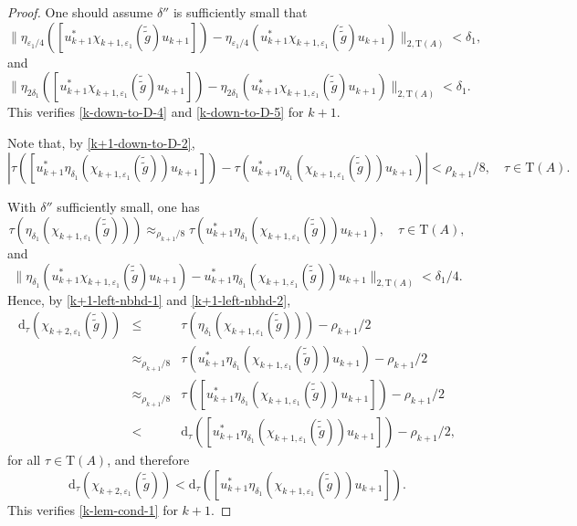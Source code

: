 \documentclass[12pt, oneside, psamsfonts]{amsart}
\theoremstyle{definition}
\theoremstyle{remark}
\numberwithin{equation}{section}
\newcommand{\norm}[1]{\| #1\|}
\newcommand{\abs}[1]{| #1 |}
\newcommand{\eps}{\varepsilon}
\newcommand{\tr}{\mathrm{T}}
\begin{document}
\begin{proof}
 One should assume $\delta''$ is sufficiently small  that
 \begin{equation}\label{k+1-down-to-D-4} 
 \norm{ \eta_{\eps_1/4}([u_{k+1}^*\chi_{k+1, \eps_1}(\tilde{\tilde{g}})u_{k+1}]) - \eta_{\eps_1/4}(u_{k+1}^*\chi_{k+1, \eps_1}(\tilde{\tilde{g}})u_{k+1}) }_{2, \tr(A)} < \delta_1,
 \end{equation}
and
 \begin{equation}\label{k+1-down-to-D-5} 
 \norm{ \eta_{2\delta_1}([u_{k+1}^*\chi_{k+1, \eps_1}(\tilde{\tilde{g}})u_{k+1}]) - \eta_{2\delta_1}(u_{k+1}^*\chi_{k+1, \eps_1}(\tilde{\tilde{g}})u_{k+1}) }_{2, \tr(A)} < \delta_1. 
 \end{equation}
 This verifies \eqref{k-down-to-D-4} and \eqref{k-down-to-D-5} for $k+1$.
 
 Note that, by \eqref{k+1-down-to-D-2}, 
\begin{equation}\label{k+1-left-nbhd-1}
 \abs{\tau( [u_{k+1}^* \eta_{\delta_1}( \chi_{k+1, \eps_1}(\tilde{\tilde{g}})) u_{k+1}] ) - \tau( u_{k+1}^* \eta_{\delta_1}( \chi_{k+1, \eps_1}(\tilde{\tilde{g}})) u_{k+1} )} < \rho_{k+1}/8,\quad \tau \in\tr(A).
 \end{equation}
 
 With $\delta''$ sufficiently small, one has
\begin{equation}\label{k+1-left-nbhd-2}
 \tau(\eta_{\delta_1}(\chi_{k+1, \eps_1}(\tilde{\tilde{g}}))) \approx_{\rho_{k+1}/8} \tau(u^*_{k+1}\eta_{\delta_1}(\chi_{k+1, \eps_1}(\tilde{\tilde{g}}))u_{k+1}),\quad \tau \in \tr(A), 
 \end{equation}
and
\begin{equation}\label{k+1-swap-u-1}
\norm{ \eta_{\delta_1}(u_{k+1}^* \chi_{k+1, \eps_1}(\tilde{\tilde{g}})u_{k+1}) - u_{k+1}^* \eta_{\delta_1}(\chi_{k+1, \eps_1}(\tilde{\tilde{g}}))u_{k+1}}_{2, \tr(A)} < \delta_1/4.
\end{equation}
Hence, by \eqref{k+1-left-nbhd-1} and \eqref{k+1-left-nbhd-2},
\begin{eqnarray*}
\mathrm{d}_\tau(\chi_{k+2, \eps_1}(\tilde{\tilde{g}})) & \leq &  \tau(\eta_{\delta_1}(\chi_{k+1, \eps_1}(\tilde{\tilde{g}}))) -\rho_{k+1}/2 \\
& \approx_{\rho_{k+1}/8} & \tau(u^*_{k+1}\eta_{\delta_1}(\chi_{k+1, \eps_1}(\tilde{\tilde{g}}))u_{k+1}) - \rho_{k+1}/2 \\
& \approx_{\rho_{k+1}/8} & \tau([u^*_{k+1}\eta_{\delta_1}(\chi_{k+1, \eps_1}(\tilde{\tilde{g}}))u_{k+1}]) - \rho_{k+1}/2  \\
& < & \mathrm{d}_\tau([u^*_{k+1}\eta_{\delta_1}(\chi_{k+1, \eps_1}(\tilde{\tilde{g}}))u_{k+1}]) - \rho_{k+1}/2,
\end{eqnarray*}
for all $\tau \in \tr(A)$,
and therefore
\begin{equation}\label{k+1-lem-cond-1}
\mathrm{d}_\tau(\chi_{k+2, \eps_1}(\tilde{\tilde{g}})) < \mathrm{d}_\tau([u^*_{k+1}\eta_{\delta_1}(\chi_{k+1, \eps_1}(\tilde{\tilde{g}}))u_{k+1}]). 
\end{equation}
This verifies \eqref{k-lem-cond-1} for $k+1$.


\end{proof}
\end{document}
